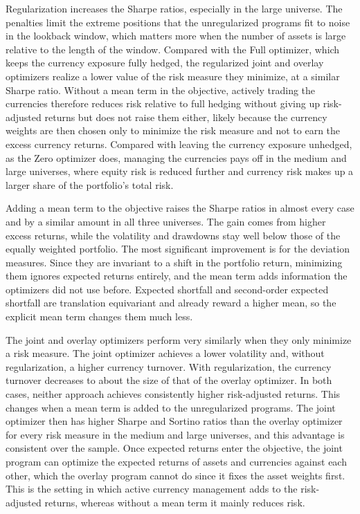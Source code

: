 Regularization increases the Sharpe ratios, especially in the large universe. The penalties limit the extreme positions
that the unregularized programs fit to noise in the lookback window, which matters more when the number of assets is
large relative to the length of the window. Compared with the Full optimizer, which keeps the currency exposure fully hedged, the regularized joint and overlay
optimizers realize a lower value of the risk measure they minimize, at a similar Sharpe ratio. Without a mean term in the objective, actively trading the currencies therefore
reduces risk relative to full hedging without giving up risk-adjusted returns but does not raise them either, likely
because the currency weights are then chosen only to minimize the risk measure and not to earn the excess currency
returns. Compared with leaving the currency exposure unhedged, as the Zero optimizer does, managing 
the currencies pays off in the medium and large universes, where equity risk is
reduced further and currency risk makes up a larger share of the portfolio's total risk.

Adding a mean term to the objective raises the Sharpe ratios in almost every case and
by a similar amount in all three universes. The gain comes from higher excess returns,
while the volatility and drawdowns stay well below those of the equally weighted
portfolio. The most significant improvement is for the deviation measures. Since they are
invariant to a shift in the portfolio return, minimizing them ignores expected returns
entirely, and the mean term adds information the optimizers did not use before.
Expected shortfall and second-order expected shortfall are translation equivariant and
already reward a higher mean, so the explicit mean term changes them much less. 

The joint and overlay optimizers perform very similarly when they only minimize a risk measure. The joint optimizer achieves a lower volatility and, without regularization, a higher currency
turnover. With regularization, the currency turnover decreases to about the size of that of
the overlay optimizer. In both cases, neither approach achieves consistently higher risk-adjusted returns. This changes when a mean term is added to the unregularized programs. The
joint optimizer then has higher Sharpe and Sortino ratios than the overlay optimizer for every risk measure in the medium and large
universes, and this advantage is consistent over the sample. Once expected returns enter the objective, the joint program can optimize the expected
returns of assets and currencies against each other, which the overlay program cannot
do since it fixes the asset weights first. This is the setting in which active
currency management adds to the risk-adjusted returns, whereas without a mean term it mainly
reduces risk.

